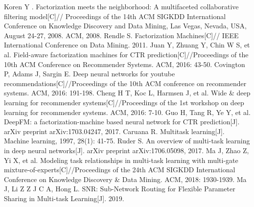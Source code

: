 \documentclass[]{article}
\begin{document}
\begin{thebibliography}{}
	 Koren Y . Factorization meets the neighborhood: A multifaceted collaborative filtering model[C]// Proceedings of the 14th ACM SIGKDD International Conference on Knowledge Discovery and Data Mining, Las Vegas, Nevada, USA, August 24-27, 2008. ACM, 2008.
	 Rendle S. Factorization Machines[C]// IEEE International Conference on Data Mining. 2011.
	 Juan Y, Zhuang Y, Chin W S, et al. Field-aware factorization machines for CTR prediction[C]//Proceedings of the 10th ACM Conference on Recommender Systems. ACM, 2016: 43-50.
	 Covington P, Adams J, Sargin E. Deep neural networks for youtube recommendations[C]//Proceedings of the 10th ACM conference on recommender systems. ACM, 2016: 191-198.
	 Cheng H T, Koc L, Harmsen J, et al. Wide \& deep learning for recommender systems[C]//Proceedings of the 1st workshop on deep learning for recommender systems. ACM, 2016: 7-10.
	 Guo H, Tang R, Ye Y, et al. DeepFM: a factorization-machine based neural network for CTR prediction[J]. arXiv preprint arXiv:1703.04247, 2017.
	 Caruana R. Multitask learning[J]. Machine learning, 1997, 28(1): 41-75.
	 Ruder S. An overview of multi-task learning in deep neural networks[J]. arXiv preprint arXiv:1706.05098, 2017.
	 Ma J, Zhao Z, Yi X, et al. Modeling task relationships in multi-task learning with multi-gate mixture-of-experts[C]//Proceedings of the 24th ACM SIGKDD International Conference on Knowledge Discovery \& Data Mining. ACM, 2018: 1930-1939.
	 Ma J, Li Z Z J C A, Hong L. SNR: Sub-Network Routing for Flexible Parameter Sharing in Multi-task Learning[J]. 2019.
\end{thebibliography}		
		
\end{document}
